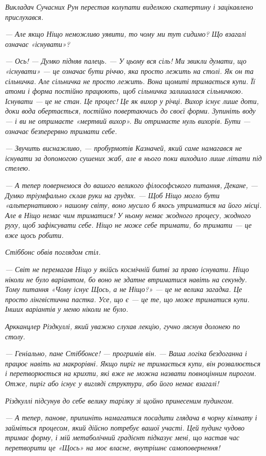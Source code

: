 \documentclass[12pt, a4paper, openany]{book}
\begin{document}
\begin{terrybox}
\textit{Викладач Сучасних Рун перестав колупати виделкою скатертину і зацікавлено прислухався.}

\textit{--- Але якщо Ніщо неможливо уявити, то чому ми тут сидимо? Що взагалі означає «існувати»?}

\textit{--- Ось! --- Думко підняв палець. --- У цьому вся сіль! Ми звикли думати, що «існувати» --- це означає бути річчю, яка просто лежить на столі. Як он та сільничка. Але сільничка не просто лежить. Вона щомиті \emph{тримається купи}. Її атоми і форма постійно працюють, щоб сільничка залишалася сільничкою. Існувати --- це не стан. Це процес! Це як вихор у річці. Вихор існує лише доти, доки вода обертається, постійно повертаючись до своєї форми. Зупиніть воду --- і ви не отримаєте «мертвий вихор». Ви отримаєте нуль вихорів. Бути --- означає безперервно тримати себе.}

\textit{--- Звучить виснажливо, --- пробурмотів Казначей, який саме намагався не існувати за допомогою сушених жаб, але в нього поки виходило лише літати під стелею.}

\textit{--- А тепер повернемося до вашого великого філософського питання, Декане, --- Думко тріумфально склав руки на грудях. --- Щоб Ніщо могло бути «альтернативою» нашому світу, воно мусило б якось \emph{утриматися} на його місці. Але в Ніщо немає чим триматися! У ньому немає жодного процесу, жодного руху, щоб зафіксувати себе. Ніщо не може себе тримати, бо тримати --- це вже щось робити.}

\textit{Стіббонс обвів поглядом стіл.}

\textit{--- Світ не перемагав Ніщо у якійсь космічній битві за право існувати. Ніщо ніколи не було варіантом, бо воно не здатне втриматися навіть на секунду. Тому питання «Чому існує Щось, а не Ніщо?» --- це не велика загадка. Це просто лінгвістична пастка. Усе, що \emph{є} --- це те, що \emph{може триматися купи}. Інших варіантів у меню ніколи не було.}

\textit{Аркканцлер Різдкуллі, який уважно слухав лекцію, гучно ляснув долонею по столу.}

\textit{--- Геніально, пане Стіббонсе! --- прогримів він. --- Ваша логіка бездоганна і працює навіть на макрорівні. Якщо пиріг не тримається купи, він розвалюється і перетворюється на крихти, які вже не можна назвати повноцінним пирогом. Отже, пиріг або існує у вигляді структури, або його немає взагалі!}

\textit{Різдкуллі підсунув до себе велику тарілку зі щойно принесеним пудингом.}

\textit{--- А тепер, панове, припиніть намагатися посадити глядача в чорну кімнату і займіться процесом, який дійсно потребує вашої участі. Цей пудинг чудово тримає форму, і мій метаболічний градієнт підказує мені, що настав час перетворити це «Щось» на моє власне, внутрішнє самоповернення!}
\end{terrybox}
\end{document}

